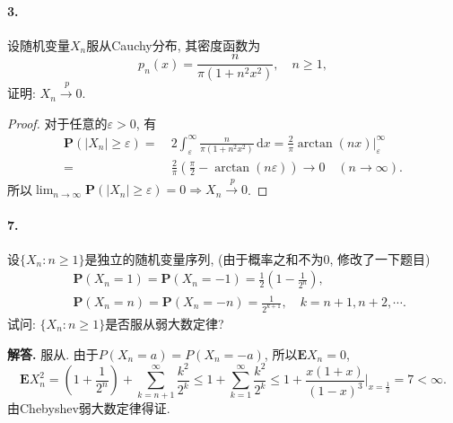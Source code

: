 \documentclass[12pt, a4paper, oneside]{ctexart}
\newenvironment{solution}{\par\noindent\textbf{解答. }}{\bigskip\par}
\let\leq=\leqslant %
\let\geq=\geqslant %
\def\d{\mathrm{d}}          %
\def\pra{\xrightarrow{\ \ p\ }}     %
\def\P{\textbf{P}}      %
\def\E{\textbf{E}}      %
\begin{document}
\paragraph*{3.}设随机变量$X_n$服从Cauchy分布, 其密度函数为
\begin{equation*}
    p_n(x) = \frac{n}{\pi(1+n^2x^2)},\quad n\geq 1,
\end{equation*}
证明: $X_n\pra 0$.
\begin{proof}
    对于任意的$\varepsilon > 0$, 有
    \begin{align*}
        \P(|X_n|\geq \varepsilon) =&\  2\int_{\varepsilon}^\infty\frac{n}{\pi(1+n^2x^2)}\,\d x = \frac{2}{\pi}\arctan (nx)\biggl|_{\varepsilon}^\infty\\
        =&\  \frac{2}{\pi}\left(\frac{\pi}{2}-\arctan(n\varepsilon)\right)\to 0\quad(n\to\infty).
    \end{align*}
    所以$\lim_{n\to\infty}\P(|X_n|\geq \varepsilon) = 0\Rightarrow X_n\pra 0$.
\end{proof}
\paragraph*{7.}设$\{X_n:n\geq 1\}$是独立的随机变量序列, (由于概率之和不为0, 修改了一下题目)
\begin{align*}
    &\ \P(X_n=1)=\P(X_n=-1)=\frac{1}{2}\left(1-\frac{1}{2^n}\right),\\
    &\ \P(X_n=n)=\P(X_n=-n)=\frac{1}{2^{k+1}},\quad k=n+1,n+2,\cdots.
\end{align*}
试问: $\{X_n:n\geq 1\}$是否服从弱大数定律?
\begin{solution}
    服从. 由于$P(X_n=a) = P(X_n=-a)$, 所以$\E X_n = 0$, 
    \begin{equation*}
        \E X_n^2 = \left(1+\frac{1}{2^n}\right)+\sum_{k=n+1}^\infty\frac{k^2}{2^k}\leq 1+\sum_{k=1}^\infty\frac{k^2}{2^k}\leq 1+\frac{x(1+x)}{(1-x)^3}\biggl|_{x=\frac{1}{2}} = 7 < \infty.
    \end{equation*}
    由Chebyshev弱大数定律得证.
\end{solution}
\end{document}
